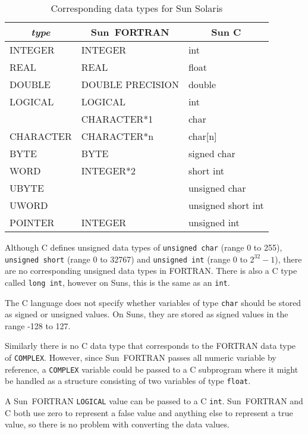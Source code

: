 \documentclass[twoside,11pt]{article}
\renewcommand{\_}{\texttt{\symbol{95}}}
\begin{document}
\begin{table}[htb]
\begin{center}
\begin{tabular}{|l|l|l|} \hline
\multicolumn{1}{|c|}{\textit{type}} & \multicolumn{1}{|c|}{Sun~FORTRAN} &
\multicolumn{1}{c|}{Sun C} \\ \hline
INTEGER & INTEGER & int \\
REAL & REAL & float \\
DOUBLE & DOUBLE PRECISION & double \\
LOGICAL & LOGICAL & int \\
 & CHARACTER*1 & char \\
CHARACTER & CHARACTER*n & char[n] \\ \hline
BYTE & BYTE & signed char \\
WORD & INTEGER*2 & short int\\
UBYTE && unsigned char \\
UWORD && unsigned short int\\ \hline
POINTER & INTEGER & unsigned int\\ \hline
\end{tabular}
\end{center}
\caption{Corresponding data types for Sun Solaris}
\label{sun_datatypes}
\end{table}

Although C defines unsigned data types of \texttt{unsigned char} 
(range 0 to 255), \texttt{unsigned short} (range 0 to 32767) and 
\texttt{unsigned int} (range 0 to $2^{32}-1$), there are no corresponding 
unsigned data types in FORTRAN\@. 
There is also a C type called \texttt{long int}, however on Suns, this is the 
same as an \texttt{int}.

The C language does not specify whether variables of type \texttt{char} should 
be stored as signed or unsigned values. On Suns, they are stored as signed
values in the range -128 to 127.

Similarly there is no C data type that corresponds to the FORTRAN data type of
\texttt{COMPLEX}\@. However, since Sun~FORTRAN passes all numeric variable by 
reference, a \texttt{COMPLEX} variable could be passed to a C subprogram where 
it might be handled as a structure consisting of two variables of type 
\texttt{float}.

A Sun~FORTRAN \texttt{LOGICAL} value can be passed to a C \texttt{int}. 
Sun~FORTRAN and C both use zero to represent a false value and anything else 
to represent a true value, so there is no problem with converting the data 
values.
\end{document}
